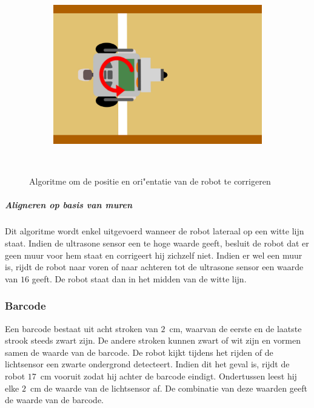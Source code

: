 \documentclass[eind]{penoverslag}
\begin{document}
\begin{figure}[h]
\begin{subfigure}[h]{0.24\textwidth}
		\caption{ }
		\label{fig:AlgoWit6}
	\end{subfigure}
	\begin{subfigure}[h]{0.24\textwidth}
		\includegraphics[width=\textwidth]{WitteLijn7}
		\caption{ }
		\label{fig:AlgoWit7}
	\end{subfigure}\\
	\caption{Algoritme om de positie en ori"entatie van de robot te corrigeren}
	\label{fig:AlgoWit}
\end{figure}

\subparagraph{Aligneren op basis van muren}
Dit algoritme wordt enkel uitgevoerd wanneer de robot lateraal op een witte lijn staat. Indien de ultrasone sensor een te hoge waarde geeft, besluit de robot dat er geen muur voor hem staat en corrigeert hij zichzelf niet. Indien er wel een muur is, rijdt de robot naar voren of naar achteren tot de ultrasone sensor een waarde van $16$ geeft. De robot staat dan in het midden van de witte lijn.

\subsubsection{Barcode}
\label{sssec:AlgoBar}
Een barcode bestaat uit acht stroken van $2$~cm, waarvan de eerste en de laatste strook steeds zwart zijn. De andere stroken kunnen zwart of wit zijn en vormen samen de waarde van de barcode. De robot kijkt tijdens het rijden of de lichtsensor een zwarte ondergrond detecteert. Indien dit het geval is, rijdt de robot $17$~cm vooruit zodat hij achter de barcode eindigt. Ondertussen leest hij elke $2$~cm de waarde van de lichtsensor af. De combinatie van deze waarden geeft de waarde van de barcode.\\
\end{document}
